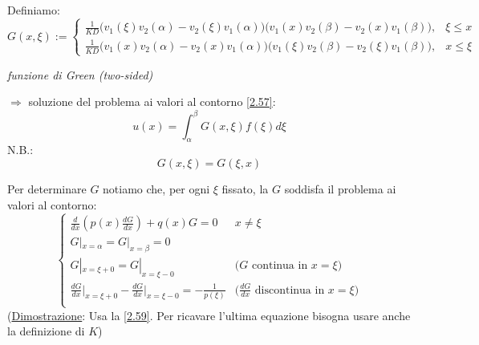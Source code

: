 \documentclass[a4paper,11pt]{report}
\begin{document}
Definiamo:
\begin{equation}
G(x,\xi):=
\begin{cases}
\frac{1}{KD}\big(v_1(\xi)v_2(\alpha)-v_2(\xi)v_1(\alpha) \big)\big(v_1(x)v_2(\beta)-v_2(x)v_1(\beta)\big), & \xi\leq x \\
\frac{1}{KD}\big(v_1(x)v_2(\alpha)-v_2(x)v_1(\alpha) \big)\big(v_1(\xi)v_2(\beta)-v_2(\xi)v_1(\beta)\big), & x\leq \xi
\end{cases}
\label{2.59}
\end{equation}
\centerline{\emph{funzione di Green (two-sided)}}

\medskip

$\Rightarrow$ soluzione del problema ai valori al contorno \eqref{2.57}:
\begin{equation}
u(x)=\int_\alpha^\beta G(x,\xi)f(\xi)d\xi
\end{equation}
N.B.: 
\begin{equation}
G(x,\xi)=G(\xi,x)
\end{equation}

Per determinare $G$ notiamo che, per ogni $\xi$ fissato, la $G$ soddisfa il problema ai valori al contorno:
\begin{equation}
\begin{cases}
\frac{d}{dx}\left(p(x)\frac{dG}{dx}\right) + q(x)G = 0 & x\neq \xi \\
G|_{x=\alpha}=G|_{x=\beta}=0 \\
G|_{x=\xi+0}=G|_{x=\xi-0} & \text{($G$ continua in $x=\xi$)} \\
\frac{dG}{dx}\big|_{x=\xi+0}-\frac{dG}{dx}\big|_{x=\xi-0}=-\frac{1}{p(\xi)} & \text{($\frac{dG}{dx}$ discontinua in $x=\xi$)} \\
\end{cases}
\label{2.62}
\end{equation}
(\underline{Dimostrazione}: Usa la \eqref{2.59}. Per ricavare l'ultima equazione bisogna usare anche la definizione di $K$)

\medskip
\end{document}
